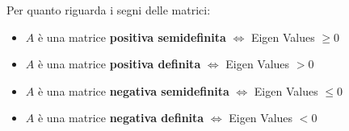 Per quanto riguarda i segni delle matrici:

\begin{itemize}
    \item $A$ è una matrice \textbf{positiva semidefinita} $\iff$ Eigen Values $\geq 0$
    \item $A$ è una matrice \textbf{positiva definita} $\iff$ Eigen Values $> 0$
    \item $A$ è una matrice \textbf{negativa semidefinita} $\iff$ Eigen Values $\leq 0$    
    \item $A$ è una matrice \textbf{negativa definita} $\iff$ Eigen Values $< 0$
\end{itemize}

